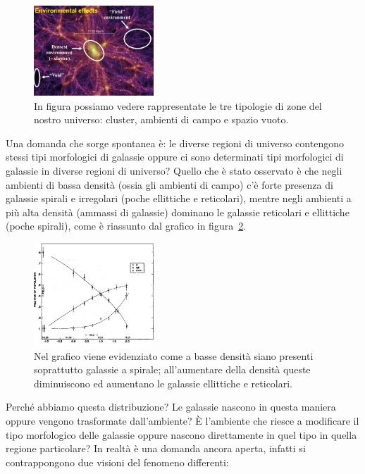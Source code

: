 \begin{figure}[htb]
	\centering
	\includegraphics[width = 0.4\textwidth]{immagini/non-omogeneita-universo.png}
	\caption{In figura possiamo vedere rappresentate le tre tipologie di zone del nostro universo: cluster, ambienti di campo e spazio vuoto.}
	\label{fig:non-omogeneo-universo}
\end{figure}

Una domanda che sorge spontanea è: le diverse regioni di universo contengono stessi tipi morfologici di galassie oppure ci sono determinati tipi morfologici di galassie in diverse regioni di universo? Quello che è stato osservato è che negli ambienti di bassa densità (ossia gli ambienti di campo) c’è forte presenza di galassie spirali e irregolari (poche ellittiche e reticolari), mentre negli ambienti a più alta densità (ammassi di galassie) dominano le galassie reticolari e ellittiche (poche spirali), come è riassunto dal grafico in figura~\ref{fig:grafico-densità-morfologia}.

\begin{figure}
	\centering
	\includegraphics[width = 0.4\textwidth]{immagini/enviromental-density.png}
	\caption{Nel grafico viene evidenziato come a basse densità siano presenti soprattutto galassie a spirale; all'aumentare della densità queste diminuiscono ed aumentano le galassie ellittiche e reticolari.}
	\label{fig:grafico-densità-morfologia}
\end{figure}

Perché abbiamo questa distribuzione? Le galassie nascono in questa maniera oppure vengono trasformate dall’ambiente? È l’ambiente che riesce a modificare il tipo morfologico delle galassie oppure nascono direttamente in quel tipo in quella regione particolare? In realtà è una domanda ancora aperta, infatti si contrappongono due visioni del fenomeno differenti:

